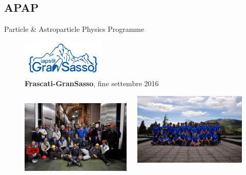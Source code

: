 \documentclass{Bredelebeamer}
\begin{document}
\subsection{APAP}
\begin{frame}{Particle \& Astroparticle Physics Programme}
\begin{figure}

\centering \includegraphics[width=4cm]{images/IAPSGS.png} \\ \textbf{Frascati-GranSasso}, fine settembre 2016 \vspace{1mm}
\begin{columns}
\begin{column}{0.5\textwidth}
\includegraphics[width=5.55cm]{images/GRANSASSO.jpg} \\
\end{column}
\begin{column}{0.5\textwidth}
\includegraphics[width=5.7cm]{images/GS.jpg}
\end{column}
\end{columns}
\end{figure}
\end{frame}
\end{document}
